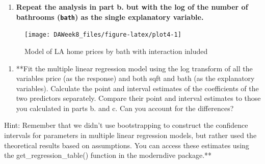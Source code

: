 \documentclass[]{article}
\providecommand{\tightlist}{%
  \setlength{\itemsep}{0pt}\setlength{\parskip}{0pt}}
\begin{document}
\begin{enumerate}
\def\labelenumi{\alph{enumi}.}
\setcounter{enumi}{2}
\tightlist
\item
  \textbf{Repeat the analysis in part b. but with the log of the number
  of bathrooms (\texttt{bath}) as the single explanatory variable.}
\end{enumerate}

\begin{figure}[H]

{\centering \texttt{[image: DAWeek8\_files/figure-latex/plot4-1]} 

}

\caption{\label{fig:plot4}Model of LA home prices by bath with interaction inluded}\label{fig:plot4}
\end{figure}

\begin{enumerate}
\def\labelenumi{\alph{enumi}.}
\setcounter{enumi}{3}
\tightlist
\item
  **Fit the multiple linear regression model using the log transform of
  all the variables price (as the response) and both sqft and bath (as
  the explanatory variables). Calculate the point and interval estimates
  of the coefficients of the two predictors separately. Compare their
  point and interval estimates to those you calculated in parts b. and
  c. Can you account for the differences?
\end{enumerate}

Hint: Remember that we didn't use bootstrapping to construct the
confidence intervals for parameters in multiple linear regression
models, but rather used the theoretical results based on assumptions.
You can access these estimates using the get\_regression\_table()
function in the moderndive package.**
\end{document}
